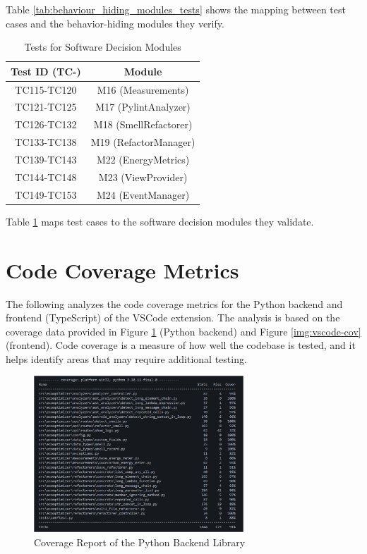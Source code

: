 \documentclass[12pt, titlepage]{article}
\begin{document}
Table \ref{tab:behaviour_hiding_modules_tests} shows the mapping between test cases and the behavior-hiding modules they verify.

\begin{table}[H]
  \centering
  \caption{Tests for Software Decision Modules}
  \begin{tabular}{cc}
    \toprule \textbf{Test ID (TC-)} & \textbf{Module} \\
    \midrule
    TC115-TC120 & M16 (Measurements) \\
    TC121-TC125 & M17 (PylintAnalyzer) \\
    TC126-TC132 & M18 (SmellRefactorer) \\
    TC133-TC138 & M19 (RefactorManager) \\
    TC139-TC143 & M22 (EnergyMetrics) \\
    TC144-TC148 & M23 (ViewProvider) \\
    TC149-TC153 & M24 (EventManager) \\
    \bottomrule
  \end{tabular}
  \label{tab:software_decision_modules_tests}
\end{table}

Table \ref{tab:software_decision_modules_tests} maps test cases to the software decision modules they validate.

\section{Code Coverage Metrics}

The following analyzes the code coverage metrics for the Python
backend and frontend (TypeScript) of the VSCode extension. The
analysis is based on the coverage data provided in Figure
\ref{img:python-cov} (Python backend) and Figure \ref{img:vscode-cov}
(frontend). Code coverage is a measure of how well the codebase is
tested, and it helps identify areas that may require additional testing.

\begin{figure}[H]
  \centering
  \includegraphics[width=0.7\textwidth]{../Images/python-coverage.png}
  \caption{Coverage Report of the Python Backend Library}
  \label{img:python-cov}
\end{figure}
\end{document}
